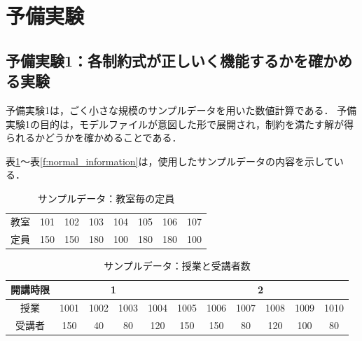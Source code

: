 \documentclass[12pt, a4paper, fleqn]{jreport}
\begin{document}
\begin{table}[H]
\begin{center}
\label{kankyo}
\caption{計算環境}
\end{center}
\end{table}
\section{予備実験}
\subsection{予備実験1：各制約式が正しいく機能するかを確かめる実験}
予備実験1は，ごく小さな規模のサンプルデータを用いた数値計算である．
予備実験1の目的は，モデルファイルが意図した形で展開され，制約を満たす解が得られるかどうかを確かめることである．

表\ref{b:normal_information}～表\ref{f:normal_information}は，使用したサンプルデータの内容を示している．\\

\begin{table}[H]
\caption{サンプルデータ：教室毎の定員}
\label{b:normal_information}
\begin{center}
\begin{tabular}{c|ccccccc}
\hline
教室 & 101 & 102 & 103 & 104 & 105 & 106 & 107 \\
定員 & 150 & 150 & 180 & 100 & 180 & 180 & 100  \\
\hline
\end{tabular}
\end{center}
\end{table}

\begin{table}[H]
\caption{サンプルデータ：授業と受講者数}
\label{c:normal_information}
\begin{center}
\begin{tabular}{c|cccc|cccccc}
\hline
開講時限 & \multicolumn{4}{c|}{1} & \multicolumn{6}{c}{2} \\
\hline
授業 & 1001& 1002 & 1003 & 1004 & 1005 & 1006 & 1007 & 1008 & 1009 & 1010 \\
受講者 & 150 & 40 & 80 & 120 & 150 & 150 & 80 & 120 & 100 & 80  \\
\hline
\end{tabular}
\end{center}
\end{table}
\end{document}
